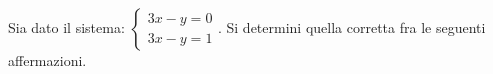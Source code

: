 Sia dato il sistema: 
$\left\{\begin{matrix}3x-y=0\\3x-y=1\end{matrix}\right.$.
Si determini quella corretta fra le seguenti affermazioni.
